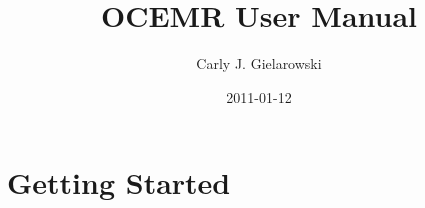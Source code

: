 \documentclass{book}
\title{OCEMR User Manual}
\author{Carly J. Gielarowski}
\date{2011-01-12}
\begin{document}
\maketitle
\tableofcontents
\part{Getting Started}

\end{document}
